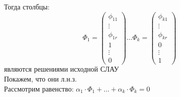 \documentclass[a4paper,12pt]{article}
\begin{document}
    Тогда столбцы:
    \[
        \Phi_1=\begin{pmatrix}
                   \phi_{11} \\
                   \vdots    \\
                   \phi_{1r} \\
                   1         \\
                   \vdots    \\
                   0
        \end{pmatrix}\ldots \Phi_k=\begin{pmatrix}
                                       \phi_{k1} \\
                                       \vdots    \\
                                       \phi_{kr} \\
                                       0         \\
                                       \vdots    \\
                                       1
        \end{pmatrix}
    \]
    являются решениями исходной СЛАУ\\
    Покажем, что они л.н.з.\\
    Рассмотрим равенство:
    $\alpha_1\cdot \Phi_1+\ldots+\alpha_k\cdot \Phi_k=0$
\end{document}
